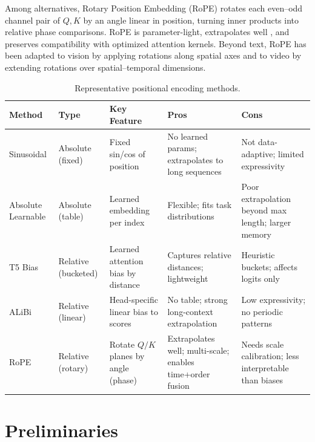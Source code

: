 \documentclass[sigconf]{acmart}
\begin{document}
Among alternatives, Rotary Position Embedding (RoPE) \cite{Su2021RoFormerET} rotates each even–odd channel pair of $Q,K$ by an angle linear in position, turning inner products into relative phase comparisons. RoPE is parameter-light, extrapolates well \cite{Peng2023YaRNEC}, and preserves compatibility with optimized attention kernels. Beyond text, RoPE has been adapted to vision \cite{Heo2024RotaryPE} by applying rotations along spatial axes and to video \cite{Gao2024TCLLaVART} \cite{Wei2025VideoRoPEWM} by extending rotations over spatial–temporal dimensions.



\begin{table}[t]
\centering
\small
\begin{tabularx}{\linewidth}{@{}l l l X X@{}}
\toprule
\textbf{Method} & \textbf{Type} & \textbf{Key Feature} & \textbf{Pros} & \textbf{Cons} \\
\midrule
Sinusoidal \cite{Vaswani2017AttentionIA} & Absolute (fixed) & Fixed sin/cos of position &
No learned params; extrapolates to long sequences &
Not data-adaptive; limited expressivity \\
Absolute Learnable \cite{Radford2019LanguageMA} & Absolute (table) & Learned embedding per index &
Flexible; fits task distributions &
Poor extrapolation beyond max length; larger memory \\
T5 Bias \cite{Raffel2019ExploringTL} & Relative (bucketed) & Learned attention bias by distance &
Captures relative distances; lightweight &
Heuristic buckets; affects logits only \\
ALiBi \cite{Press2021TrainST} & Relative (linear) & Head-specific linear bias to scores &
No table; strong long-context extrapolation &
Low expressivity; no periodic patterns \\
RoPE \cite{Su2021RoFormerET} & Relative (rotary) & Rotate \(Q/K\) planes by angle (phase) &
Extrapolates well; multi-scale; enables time+order fusion &
Needs scale calibration; less interpretable than biases \\
\bottomrule
\end{tabularx}
\caption{Representative positional encoding methods.}
\label{table:compare_pe}
\end{table}



\section{Preliminaries}
\end{document}
